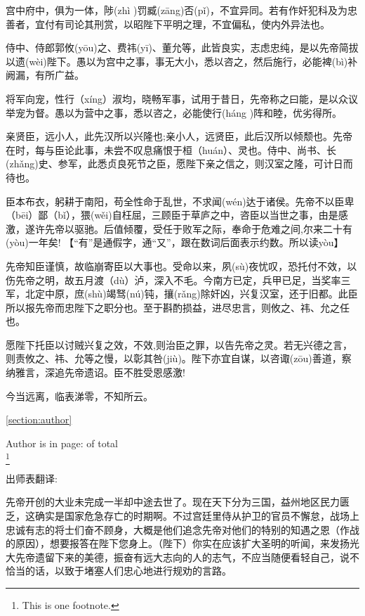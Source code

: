 \documentclass[]{ctexart}
\begin{document}
	宫中府中，俱为一体，陟(zhì )罚臧(zāng)否(pǐ)，不宜异同。若有作奸犯科及为忠善者，宜付有司论其刑赏，以昭陛下平明之理，不宜偏私，使内外异法也。
	
	侍中、侍郎郭攸(yōu)之、费祎(yī)、董允等，此皆良实，志虑忠纯，是以先帝简拔以遗(wèi)陛下。愚以为宫中之事，事无大小，悉以咨之，然后施行，必能裨(bì)补阙漏，有所广益。
	
	将军向宠，性行（xíng）淑均，晓畅军事，试用于昔日，先帝称之曰能，是以众议举宠为督。愚以为营中之事，悉以咨之，必能使行(háng )阵和睦，优劣得所。
	
	亲贤臣，远小人，此先汉所以兴隆也;亲小人，远贤臣，此后汉所以倾颓也。先帝在时，每与臣论此事，未尝不叹息痛恨于桓（huán）、灵也。侍中、尚书、长(zhǎng)史、参军，此悉贞良死节之臣，愿陛下亲之信之，则汉室之隆，可计日而待也。
	
	臣本布衣，躬耕于南阳，苟全性命于乱世，不求闻(wén)达于诸侯。先帝不以臣卑（bēi）鄙（bǐ），猥(wěi)自枉屈，三顾臣于草庐之中，咨臣以当世之事，由是感激，遂许先帝以驱驰。后值倾覆，受任于败军之际，奉命于危难之间,尔来二十有(yòu)一年矣! 【“有”是通假字，通“又”，跟在数词后面表示约数。所以读yòu】
	
	先帝知臣谨慎，故临崩寄臣以大事也。受命以来，夙(sù)夜忧叹，恐托付不效，以伤先帝之明，故五月渡（dù）泸，深入不毛。今南方已定，兵甲已足，当奖率三军，北定中原，庶(shù)竭驽(nú)钝，攘(rǎng)除奸凶，兴复汉室，还于旧都。此臣所以报先帝而忠陛下之职分也。至于斟酌损益，进尽忠言，则攸之、祎、允之任也。
	
	愿陛下托臣以讨贼兴复之效，不效,则治臣之罪，以告先帝之灵。若无兴德之言，则责攸之、祎、允等之慢，以彰其咎(jiù)。陛下亦宜自谋，以咨诹(zōu)善道，察纳雅言，深追先帝遗诏。臣不胜受恩感激!
	
	今当远离，临表涕零，不知所云。
	
	\ref{section:author} 	%
	
	Author is in page: \pageref{section:author} of total \pageref{LastPage} \\
	
	\footnote{This is one footnote.}
	
	出师表翻译:
	
	先帝开创的大业未完成一半却中途去世了。现在天下分为三国，益州地区民力匮乏，这确实是国家危急存亡的时期啊。不过宫廷里侍从护卫的官员不懈怠，战场上忠诚有志的将士们奋不顾身，大概是他们追念先帝对他们的特别的知遇之恩（作战的原因），想要报答在陛下您身上。（陛下）你实在应该扩大圣明的听闻，来发扬光大先帝遗留下来的美德，振奋有远大志向的人的志气，不应当随便看轻自己，说不恰当的话，以致于堵塞人们忠心地进行规劝的言路。
	
\end{document}
